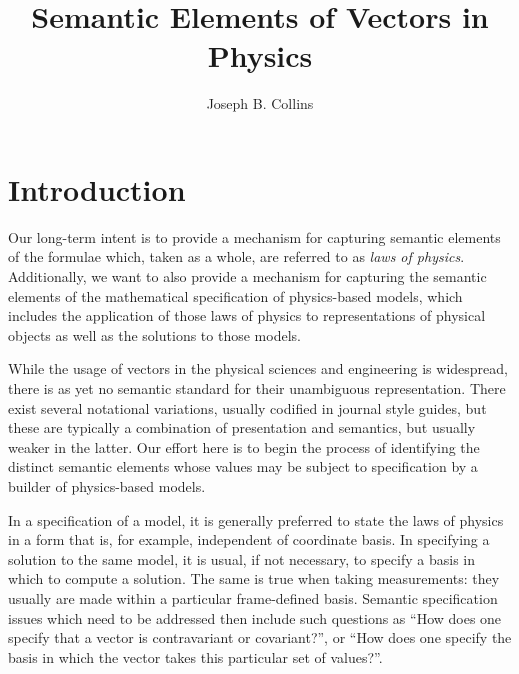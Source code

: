 \documentclass{llncs}
\begin{document}
\title{Semantic Elements of Vectors in Physics}
\author{Joseph B. Collins}

\maketitle

\begin{abstract}

\end{abstract}

\section{Introduction}

Our long-term intent is to provide a mechanism for capturing semantic
elements of the formulae which, taken as a whole, are referred to as
{\em laws of physics}.
Additionally, we want to also provide a mechanism for capturing the
semantic elements of the mathematical specification of physics-based
models, which includes the application of those laws of physics to
representations of physical objects as well as the solutions to those models.

While the usage of vectors in the physical sciences and engineering is
widespread, there is as yet no semantic standard for their unambiguous
representation.
There exist several notational variations, usually codified in journal
style guides, but these are typically a combination of presentation 
and semantics, but usually weaker in the latter.
Our effort here is to begin the process of identifying the distinct
semantic elements whose values may be subject to specification by a
builder of physics-based models.

In a specification of a model, it is generally preferred to state the
laws of physics in a form that is, for example, independent of
coordinate basis.
In specifying a solution to the same model, it is usual, if not
necessary, to specify a basis in which to compute a solution.
The same is true when taking measurements: they usually are made
within a particular frame-defined basis.
Semantic specification issues which need to be addressed then include
such questions as ``How does one specify that a vector is
contravariant or covariant?'', or ``How does one specify the basis in
which the vector takes this particular set of values?''.
\end{document}
